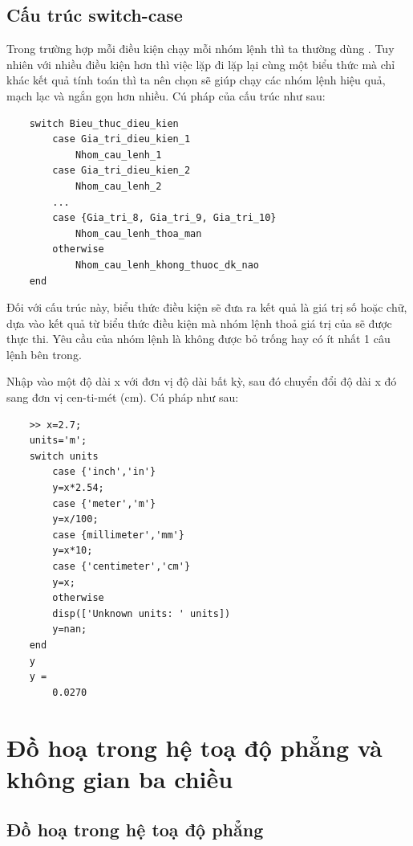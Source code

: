 \documentclass[12pt,a4paper]{article}
\begin{document}
\subsection{Cấu trúc switch-case}
Trong trường hợp mỗi điều kiện chạy mỗi nhóm lệnh thì ta thường dùng . Tuy nhiên với nhiều điều kiện hơn thì việc lặp đi lặp lại cùng một biểu thức mà chỉ khác kết quả tính toán thì ta nên chọn  sẽ giúp chạy các nhóm lệnh hiệu quả, mạch lạc và ngắn gọn hơn nhiều. Cú pháp của cấu trúc  như sau:
\begin{lstlisting}
	switch Bieu_thuc_dieu_kien
		case Gia_tri_dieu_kien_1
			Nhom_cau_lenh_1
		case Gia_tri_dieu_kien_2
			Nhom_cau_lenh_2
		...
		case {Gia_tri_8, Gia_tri_9, Gia_tri_10}
			Nhom_cau_lenh_thoa_man
		otherwise
			Nhom_cau_lenh_khong_thuoc_dk_nao
	end
\end{lstlisting}
Đối với cấu trúc này, biểu thức điều kiện sẽ đưa ra kết quả là giá trị số hoặc chữ, dựa vào kết quả từ biểu thức điều kiện mà nhóm lệnh thoả giá trị của  sẽ được thực thi. Yêu cầu của nhóm lệnh là không được bỏ trống hay có ít nhất 1 câu lệnh bên trong.
\begin{example}
Nhập vào một độ dài x với đơn vị độ dài bất kỳ, sau đó chuyển đổi độ dài x đó sang đơn vị cen-ti-mét (cm). Cú pháp như sau:
\begin{lstlisting}
	>> x=2.7;
	units='m';
	switch units
		case {'inch','in'}
		y=x*2.54;
		case {'meter','m'}
		y=x/100;
		case {millimeter','mm'}
		y=x*10;
		case {'centimeter','cm'}
		y=x;
		otherwise
		disp(['Unknown units: ' units])
		y=nan;
	end
	y
	y =
    	0.0270
\end{lstlisting}
\end{example}

\section{Đồ hoạ trong hệ toạ độ phẳng và không gian ba chiều}
\subsection{Đồ hoạ trong hệ toạ độ phẳng}
\end{document}
